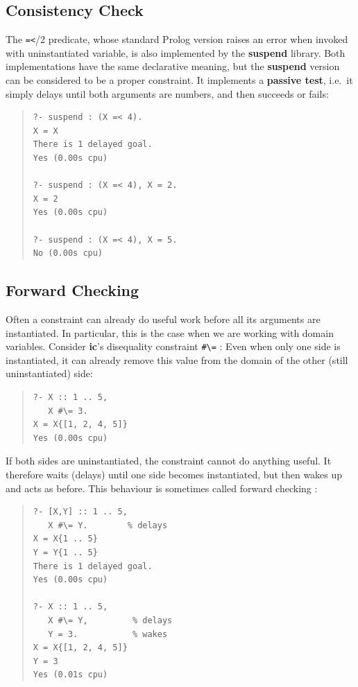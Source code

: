 \subsection{Consistency Check}
The \verb.=<./2 predicate, whose standard Prolog version raises an error
when invoked with uninstantiated variable, is also implemented by the
{\bf suspend} library. Both implementations
have the same declarative meaning, but the {\bf suspend} version can
be considered to be a proper constraint.
It implements a {\bf passive test}, i.e.\
it simply delays until both arguments are numbers, and then succeeds or fails:
\begin{quote}\begin{verbatim}
?- suspend : (X =< 4).
X = X
There is 1 delayed goal.
Yes (0.00s cpu)

?- suspend : (X =< 4), X = 2.
X = 2
Yes (0.00s cpu)

?- suspend : (X =< 4), X = 5.
No (0.00s cpu)
\end{verbatim}\end{quote}

\subsection{Forward Checking}
Often a constraint can already do useful work before all its arguments
are instantiated. In particular, this is the case when we are working
with domain variables. Consider {\bf ic}'s disequality constraint \verb.#\=.  :
Even when only one side is instantiated, it can already remove this value
from the domain of the other (still uninstantiated) side:
\begin{quote}\begin{verbatim}
?- X :: 1 .. 5,
   X #\= 3.
X = X{[1, 2, 4, 5]}
Yes (0.00s cpu)
\end{verbatim}\end{quote}
If both sides are uninstantiated, the constraint cannot do anything useful.
It therefore waits (delays) until one side becomes instantiated,
but then wakes up and acts as before.
This behaviour is sometimes called forward checking \cite{VanHentenryck}:
\begin{quote}\begin{verbatim}
?- [X,Y] :: 1 .. 5,
   X #\= Y.        % delays
X = X{1 .. 5}
Y = Y{1 .. 5}
There is 1 delayed goal.
Yes (0.00s cpu)

?- X :: 1 .. 5,
   X #\= Y,         % delays
   Y = 3.           % wakes
X = X{[1, 2, 4, 5]}
Y = 3
Yes (0.01s cpu)
\end{verbatim}\end{quote}

